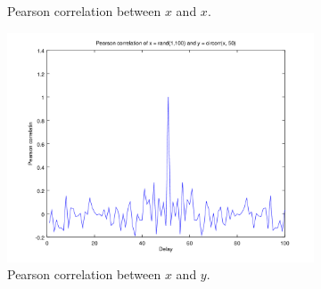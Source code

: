 \documentclass{article}
\begin{document}
\begin{figure}[H]
\begin{subfigure}{0.49\textwidth}
		\caption{Pearson correlation between $x$ and $x$.}
	\end{subfigure}
	\begin{subfigure}{0.49\textwidth}
		\centering
		\includegraphics[width=\textwidth]{plot1gc.png}
		\caption{Pearson correlation between $x$ and $y$.}
	\end{subfigure}		
	\caption{}
	\label{fig:1g1}
\end{figure}
\end{document}
